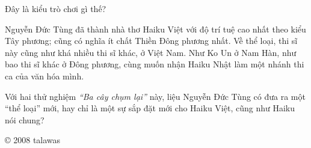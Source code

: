 \documentclass[../main.tex]{subfiles}
\begin{document}
\begin{multicols}{2}
\begin{blockquote}
{Đây là kiểu trò chơi gì thế?} 

\end{blockquote}
 
Nguyễn Đức Tùng đã thành nhà thơ Haiku Việt với độ trí tuệ cao nhất theo kiểu Tây phương; cũng có nghĩa ít chất Thiền Đông phương nhất. Về thể loại, thi sĩ này cũng như khá nhiều thi sĩ khác, ở Việt Nam. Như Ko Un ở Nam Hàn, như bao thi sĩ khác ở Đông phương, cùng muốn nhận Haiku Nhật làm một nhánh thi ca của văn hóa mình. 
 
Với hai thử nghiệm \textit{“Ba cây chụm lại”} này, liệu Nguyễn Đức Tùng có đưa ra một “thể loại” mới, hay chỉ là một sự sắp đặt mới cho Haiku Việt, cũng như Haiku nói chung? 
 
© 2008 talawas 
\end{multicols}
\end{document}
